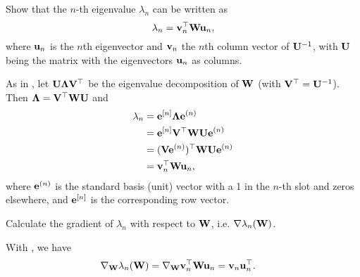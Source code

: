 \begin{exenumerate}
\item Show that the $n$-th eigenvalue $\lambda_n$ can be written as
  \begin{equation}
    \lambda_n=\mathbf{v}_n^\top \mathbf{W} \mathbf{u}_n,
  \end{equation}
  where $\mathbf{u}_n$ is the $n$th eigenvector and $\mathbf{v}_n$ the $n$th column vector of $\mathbf{U}^{-1}$, with $\mathbf{U}$ being the matrix with the eigenvectors $\mathbf{u}_n$ as columns.
  
  \begin{solution}
    As in , let $\mathbf{U}\mathbf{\Lambda} \mathbf{V}^\top$ be the
    eigenvalue decomposition of $\mathbf{W}$ (with $\mathbf{V}^\top = \mathbf{U}^{-1}$). Then $\mathbf{\Lambda} = \mathbf{V}^\top
    \mathbf{W}\mathbf{U}$ and
    \begin{align}
      \lambda_n &= \mathbf{e}^{[n]}\mathbf{\Lambda}\mathbf{e}^{(n)} \\
                &= \mathbf{e}^{[n]}\mathbf{V}^\top \mathbf{W} \mathbf{U}\mathbf{e}^{(n)} \\
                &= (\mathbf{V}\mathbf{e}^{(n)})^\top \mathbf{W}\mathbf{U}\mathbf{e}^{(n)} \\
                &= \mathbf{v}_n^\top \mathbf{W}\mathbf{u}_n,
    \end{align}
    where $\mathbf{e}^{(n)}$ is the standard basis (unit) vector with a 1 in the $n$-th
    slot and zeros elsewhere, and $\mathbf{e}^{[n]}$ is the corresponding row vector.
  \end{solution}
  
\item Calculate the gradient of $\lambda_n$ with respect to $\mathbf{W}$, i.e. $\nabla \lambda_n(\mathbf{W})$.

  \begin{solution}
    With , we have
    \begin{align}
      \nabla_{\mathbf{W}} \lambda_n(\mathbf{W}) &= \nabla_{\mathbf{W}} \mathbf{v}_n^\top \mathbf{W} \mathbf{u}_n = \mathbf{v}_n \mathbf{u}_n^\top.
    \end{align}
  \end{solution}
  

\end{exenumerate}
